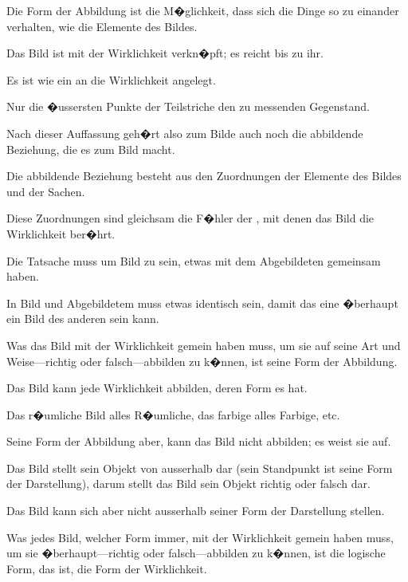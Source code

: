 {Die Form der Abbildung ist die M�glichkeit,
dass sich die Dinge so zu einander verhalten, wie
die Elemente des Bildes.}


{Das Bild ist  mit der Wirklichkeit verkn�pft;
es reicht bis zu ihr.}


{Es ist wie ein  an die Wirklichkeit
angelegt.}


{Nur die �ussersten Punkte der Teilstriche
 den zu messenden Gegenstand.}


{Nach dieser Auffassung geh�rt also zum Bilde
auch noch die abbildende Beziehung, die es zum
Bild macht.}


{Die abbildende Beziehung besteht aus den
Zuordnungen der Elemente des Bildes und der
Sachen.}


{Diese Zuordnungen sind gleichsam die F�hler
der , mit denen das Bild die Wirklichkeit
ber�hrt.}


{Die Tatsache muss um Bild zu sein, etwas mit
dem Abgebildeten gemeinsam haben.}


{In Bild und Abgebildetem muss etwas identisch
sein, damit das eine �berhaupt ein Bild des anderen
sein kann.}


{Was das Bild mit der Wirklichkeit gemein
haben muss, um sie auf seine Art und Weise---richtig
oder falsch---abbilden zu k�nnen, ist seine
Form der Abbildung.}


{Das Bild kann jede Wirklichkeit abbilden,
deren Form es hat.

Das r�umliche Bild alles R�umliche, das farbige
alles Farbige, etc.}


{Seine Form der Abbildung aber, kann das Bild
nicht abbilden; es weist sie auf.}


{Das Bild stellt sein Objekt von ausserhalb dar
(sein Standpunkt ist seine Form der Darstellung),
darum stellt das Bild sein Objekt richtig oder
falsch dar.}


{Das Bild kann sich aber nicht ausserhalb seiner
Form der Darstellung stellen.}


{Was jedes Bild, welcher Form immer, mit der
Wirklichkeit gemein haben muss, um sie �berhaupt---richtig
oder falsch---ab\-bil\-den zu k�nnen,
ist die logische Form, das ist, die Form der
Wirklichkeit.}



